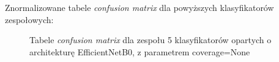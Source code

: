 \documentclass[polish,12pt]{aghthesis}
\begin{document}
\newpage
\noindent Znormalizowane tabele \textit{confusion matrix} dla powyższych klasyfikatorów zespołowych:
\begin{figure}[h!]%
    \begin{adjustbox}{minipage=1.0\paperwidth, pagecenter}
    \centering
    \qquad
    \end{adjustbox}
    \label{fig:eff-ens-5-None-matrices}
    \caption{Tabele \textit{confusion matrix} dla zespołu 5 klasyfikatorów opartych o architekturę EfficientNetB0, z parametrem coverage=None}
\end{figure}
\end{document}
